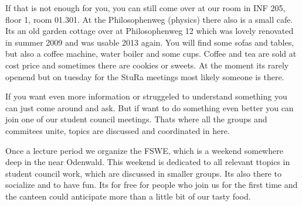 If that is not enough for you, you can still come over at our room in INF 205, floor 1, room 01.301. At the Philosophenweg (physics) there also is a small cafe. Its an old garden cottage over at Philosophenweg 12 which was lovely renovated in summer 2009 and was usable 2013 again. You will find some sofas and tables, but also a coffee machine, water boiler and some cups. Coffee and tea are sold at cost price and sometimes there are cookies or 
sweets. At the moment its rarely openend but on tuesday for the \gls{StuRa} meetings most likely someone is there.

If you want even more information or struggeled to understand something you can just come around and ask. But if want to do something even better you can join one of our student council meetings. Thats where all the groups and commitees unite, topics are discussed and coordinated in here.

Once a lecture period we organize the \gls{FSWE}, which is a weekend somewhere deep in the near Odenwald. This weekend is dedicated to all relevant ttopics in student council work, which are discussed in smaller groups. Its also there to socialize and to have fun. Its for free for people who join us for the first time and the canteen could anticipate more than a little bit of our tasty food.
